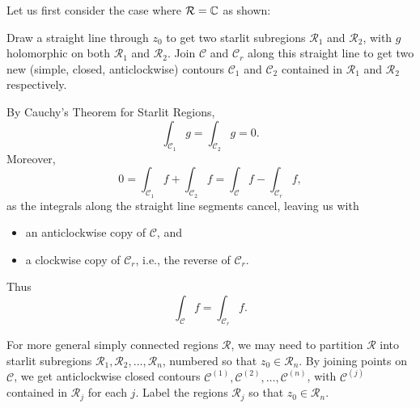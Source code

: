 Let us first consider the case where $\mathcal{R} = \mathbb{C}$ as shown:
\begin{center}
\end{center}
\begin{blankbox}
Draw a straight line through $z_0$ to get two starlit subregions $\mathcal{R}_1$ and $\mathcal{R}_2$, with $g$ holomorphic on both $\mathcal{R}_1$ and $\mathcal{R}_2$. Join $\mathcal{C}$ and $\mathcal{C}_r$ along this straight line to get two new (simple, closed, anticlockwise) contours $\mathcal{C}_1$ and $\mathcal{C}_2$ contained in $\mathcal{R}_1$ and $\mathcal{R}_2$ respectively.

By Cauchy's Theorem for Starlit Regions,
\[
\int_{\mathcal{C}_1} g = \int_{\mathcal{C}_2} g = 0.
\]
Moreover,
\[
0= \int_{\mathcal{C}_1} f + \int_{\mathcal{C}_2} f = \int_{\mathcal{C}} f - \int_{\mathcal{C}_r} f,
\]
as the integrals along the straight line segments cancel, leaving us with
\begin{itemize}
\item an anticlockwise copy of $\mathcal{C}$, and
\item a clockwise copy of $\mathcal{C}_r$, i.e., the reverse of $\mathcal{C}_r$.
\end{itemize}
Thus
\[
\int_{\mathcal{C}} f = \int_{\mathcal{C}_r} f.
\]
\end{blankbox}

For more general simply connected regions $\mathcal{R}$, we may need to partition $\mathcal{R}$ into starlit subregions $\mathcal{R}_1,\mathcal{R}_2,\ldots, \mathcal{R}_n$, numbered so that $z_0 \in \mathcal{R}_n$. By joining points on $\mathcal{C}$, we get anticlockwise closed contours $\mathcal{C}^{(1)},\mathcal{C}^{(2)},\ldots,\mathcal{C}^{(n)}$, with $\mathcal{C}^{(j)}$ contained in $\mathcal{R}_j$ for each $j$.  Label the regions $\mathcal{R}_j$ so that $z_0 \in \mathcal{R}_n$. 

\begin{center}
\end{center}

